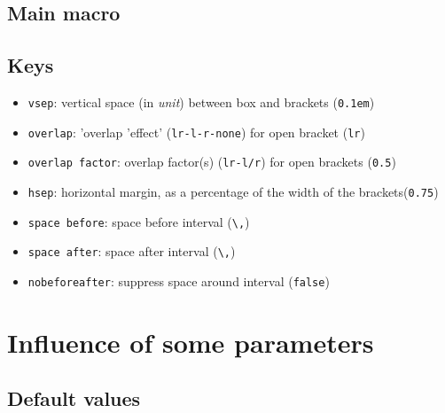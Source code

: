 \documentclass[english,parskip=half-,paper=a4]{scrartcl}
\begin{document}
\subsection{Main macro}

\begin{codeblockA}[title=Macro (english usage)]
\end{codeblockA}

\begin{codeblockA}[title=Macro (french usage)]
\end{codeblockA}

\subsection{Keys}

\begin{itemize}[noitemsep]
	\item \texttt{vsep}: vertical space (in \textit{unit}) between box and brackets \hfill(\texttt{0.1em})
	\item \texttt{overlap}: 'overlap 'effect' (\texttt{lr-l-r-none}) for open bracket \hfill(\texttt{lr})
	\item \texttt{overlap factor}: overlap factor(s) (\texttt{lr-l/r}) for open brackets \hfill(\texttt{0.5})
	\item \texttt{hsep}: horizontal margin, as a percentage of the width of the brackets\hfill(\texttt{0.75})
	\item \texttt{space before}: space before interval \hfill(\texttt{\textbackslash,})
	\item \texttt{space after}: space after interval \hfill(\texttt{\textbackslash,})
	\item \texttt{nobeforeafter}: suppress space around interval \hfill(\texttt{false})
\end{itemize}

\section{Influence of some parameters}

\subsection{Default values}
\end{document}
